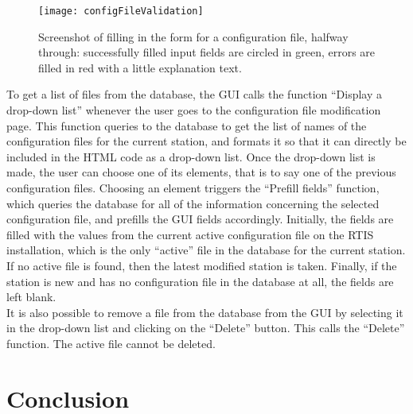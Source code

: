 \documentclass{themeensg}
\begin{document}
\begin{figure}[ht]
	\centering
	\texttt{[image: configFileValidation]}
	\caption{Screenshot of filling in the form for a configuration file, halfway through: successfully filled input fields are circled in green, errors are filled in red with a little explanation text.}
\end{figure}

To get a list of files from the database, the GUI calls the function “Display a drop-down list” whenever the user goes to the configuration file modification page. This function queries to the database to get the list of names of the configuration files for the current station, and formats it so that it can directly be included in the HTML code as a drop-down list. Once the drop-down list is made, the user can choose one of its elements, that is to say one of the previous configuration files. Choosing an element triggers the “Prefill fields” function, which queries the database for all of the information concerning the selected configuration file, and prefills the GUI fields accordingly. Initially, the fields are filled with the values from the current active configuration file on the RTIS installation, which is the only “active” file in the database for the current station. If no active file is found, then the latest modified station is taken. Finally, if the station is new and has no configuration file in the database at all, the fields are left blank.\\
It is also possible to remove a file from the database from the GUI by selecting it in the drop-down list and clicking on the “Delete” button. This calls the “Delete” function. The active file cannot be deleted.

\newevenpage
\chapter*{Conclusion}
  \vspace{1.5cm}
\end{document}
